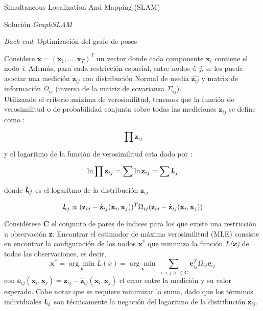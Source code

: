 \begin{subsection}{Simultaneous Localization And Mapping (SLAM) }
\begin{subsection}{Solución \textit{GraphSLAM}}
\begin{subsection}
{\textit{Back-end}: Optimización del grafo de poses}

Considere $\textbf{x} = (\textbf{x}_{1}, ..., \textbf{x}_{T})^{T}$ un vector donde cada componente $\textbf{x}_{i}$ contiene el nodo \textsl{i}. Además, para cada restricción espacial, entre nodos \textsl{i, j}, se les puede asociar una medición $\textbf{z}_{ij}$ con distribución Normal de media $\hat{\textbf{z}_{ij}}$ y matrix de información $\Omega_{ij}$ (inversa de la matriz de covarianza $\Sigma_{ij}$). \\
Utilizando el criterio máxima de verosimilitud, tenemos que la función de verosimilitud o de probabilidad conjunta \cite{wiki-mle} sobre todas las mediciones $\textbf{z}_{ij}$ se define como :

\begin{equation}
\prod{\textbf{z}_{ij}}
\end{equation}

y el logaritmo de la función de verosimilitud esta dado por :

\begin{equation}
\ln \prod{\textbf{z}_{ij}} = \sum{\ln \textbf{z}_{ij}} = \sum{\textit{\textbf{l}}_{ij}}
\end{equation}

donde $\textit{\textbf{l}}_{ij}$ es el logaritmo de la distribución $\textbf{z}_{ij}$

\begin{equation}
\textit{\textbf{l}}_{ij} \propto (\textbf{z}_{ij}-\hat{\textbf{z}}_{ij}(\textbf{x}_{i},\textbf{x}_{j}))^{T}\Omega_{ij}(\textbf{z}_{ij}-\hat{\textbf{z}}_{ij}(\textbf{x}_{i},\textbf{x}_{j}))
\end{equation}

Considérese \textbf{C} el conjunto de pares de índices para los que existe una restricción u observación \textbf{z}. Encontrar el estimador de máxima verosimilitud (MLE) consiste en encontrar la configuración de los nodos $\textbf{x}^{*}$ que minimiza la función \textit{L(\textbf{x})} de todas las observaciones, es decir,
\begin{equation}
\textbf{x}^{*} = \underset{\textbf{x}}{\arg\min} L(x) = \underset{\textbf{x}}{\arg\min} \sum_{<i,j>\in \mathcal{\textbf{C}}}\textbf{e}_{ij}^{T}\Omega_{ij}\textbf{e}_{ij}
\end{equation}
con $\textbf{e}_{ij}(\textbf{x}_{i},\textbf{x}_{j})=\textbf{z}_{ij}-\hat{\textbf{z}}_{ij}(\textbf{x}_{i},\textbf{x}_{j})$ el error entre la medición y su valor esperado.
Cabe notar que se requiere minimizar la suma, dado que los términos individuales $\textit{\textbf{l}}_{ij}$ son técnicamente la negación del logaritmo de la distribución $\textbf{z}_{ij}$.


\end{subsection}
\end{subsection}
\end{subsection}
